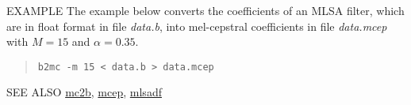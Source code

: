 \begin{options}
\end{options}

\begin{qsection}{EXAMPLE}
The example below converts the coefficients of an MLSA filter,
which are in float format in file {\em data.b},
into mel-cepstral coefficients
in file {\em data.mcep} with $M=15$ and $\alpha=0.35$.
\begin{quote}
 \verb!b2mc -m 15 < data.b > data.mcep!
\end{quote} 
\end{qsection}

\begin{qsection}{SEE ALSO}
\hyperlink{mc2b}{mc2b},
\hyperlink{mcep}{mcep},
\hyperlink{mlsadf}{mlsadf}
\end{qsection}
